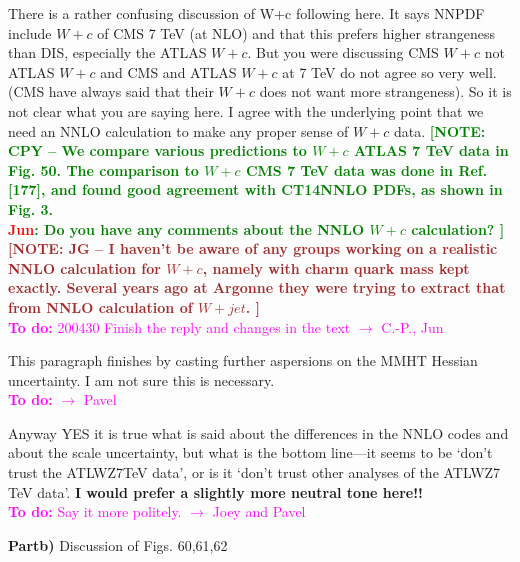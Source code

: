 \documentclass[aps,prd,amsmath,nofootinbib,floatfix,fleqn]{revtex4}
\newcommand{\TODO}[1]{\textcolor{magenta}{
\quad\vspace{3pt} \\ {\bf To do:} #1 \\
}}
\newcommand{\NOTECPY}[1]{\textcolor{green}{ \bf[NOTE: CPY -- #1 ]}}
\newcommand{\NOTEJG}[1]{\textcolor{brown}{ \bf[NOTE: JG -- #1 ]}}
\begin{document}
\noindent
There is a rather confusing discussion of W+c following here. It says NNPDF include $W+c$ of CMS
7 TeV (at NLO) and that this prefers higher strangeness than DIS, especially the ATLAS $W+c$.
But you were discussing CMS $W+c$ not ATLAS $W+c$ and CMS and ATLAS $W+c$ at 7 TeV do not agree
so very well. (CMS have always said that their $W+c$ does not want more strangeness). So it is not clear what you are saying here. I agree with the underlying point that we need an NNLO calculation to make any proper sense of $W+c$ data.  
\NOTECPY{We compare various predictions to $W+c$ ATLAS 7 TeV data in Fig. 50. The comparison to  $W+c$ CMS 7 TeV data was done in Ref. [177], and found good agreement with CT14NNLO PDFs, as shown in Fig. 3. 
\\ \textcolor{red}{Jun}: Do you have any comments about the NNLO $W+c$ calculation?}\\
\NOTEJG{I haven't be aware of any groups working on a realistic NNLO calculation for $W+c$, namely with charm quark mass kept exactly. Several years ago at Argonne they were trying to extract that from NNLO calculation of $W+jet$.}
\TODO{200430 Finish the reply and changes in the text $\to$ C.-P., Jun}


\noindent
This paragraph finishes by casting further aspersions on the MMHT Hessian uncertainty. I am not sure
this is necessary.  
\TODO{$\to$ Pavel}

\noindent
Anyway YES it is true what is said about the differences in the NNLO codes and about the scale
uncertainty, but what is the bottom line—it seems to be ‘don’t trust the ATLWZ7TeV data’, or is it
‘don’t trust other analyses of the ATLWZ7 TeV data’. {\bf I would prefer a slightly more neutral tone here!!}  
\TODO{Say it more politely. $\to$ Joey and Pavel}

{\bf Partb)}
Discussion of Figs. 60,61,62  \\
\end{document}
